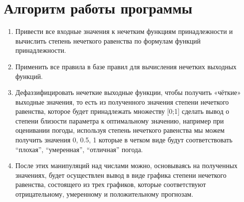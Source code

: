 \documentclass[12pt,a4paper]{report}
\begin{document}
\section{Алгоритм работы программы}
\begin{enumerate}
    \item Привести все входные значения к нечетким функциям принадлежности и вычислить степень нечеткого равенства по формулам функций принадлежности. 
    \item Применить все правила в базе правил для вычисления нечетких выходных функций.
    \item Дефаззифицировать нечеткие выходные функции, чтобы получить «чёткие» выходные значения, то есть из полученного значения степени нечеткого равенства, которое будет принадлежать множеству [0;1] сделать вывод о степени близости параметра к оптимальному значению, например при оценивании погоды, используя степень нечеткого равенства мы можем получить значения 0, 0.5, 1 которые в четком виде будут соответствовать “плохая”, “умеренная”, “отличная” погода.
    \item После этих манипуляций над числами можно, основываясь на полученных значениях, будет осуществлен вывод в виде графика степени нечеткого равенства, состоящего из трех графиков, которые соответствуют отрицательному, умеренному и положительному прогнозам.
\end{enumerate}

\newpage
\end{document}
